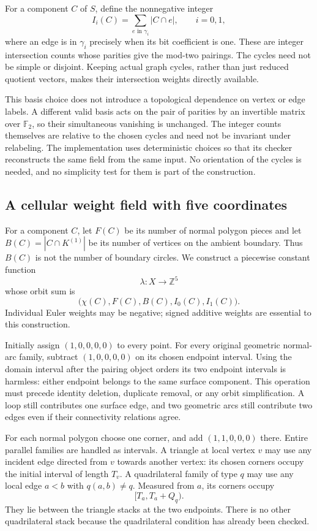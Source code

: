 For a component $C$ of $S$, define the nonnegative integer
\[
 I_i(C)=\sum_{e\text{ in }\gamma_i}|C\cap e|,
 \qquad i=0,1,
\]
where an edge is in $\gamma_i$ precisely when its bit coefficient
is one.  These are integer intersection counts whose parities give
the mod-two pairings.  The cycles need not be simple or disjoint.
Keeping actual graph cycles, rather than just reduced quotient
vectors, makes their intersection weights directly available.

This basis choice does not introduce a topological dependence on
vertex or edge labels.  A different valid basis acts on the pair
of parities by an invertible matrix over $\mathbb F_2$, so their
simultaneous vanishing is unchanged.  The integer counts themselves
are relative to the chosen cycles and need not be invariant under
relabeling.  The implementation uses deterministic choices so that
its checker reconstructs the same field from the same input.  No
orientation of the cycles is needed, and no simplicity test for
them is part of the construction.

\subsection{A cellular weight field with five coordinates}
\label{nc:weights}

For a component $C$, let $F(C)$ be its number of normal polygon
pieces and let $B(C)=|C\cap K^{(1)}|$ be its number of vertices on
the ambient boundary.  Thus $B(C)$ is not the number of boundary
circles.  We construct a piecewise constant function
\[
 \lambda:X\longrightarrow\mathbb Z^5
\]
whose orbit sum is
\begin{equation}\label{nc:profile-vector}
 \bigl(\chi(C),F(C),B(C),I_0(C),I_1(C)\bigr).
\end{equation}
Individual Euler weights may be negative; signed additive weights
are essential to this construction.

Initially assign $(1,0,0,0,0)$ to every point.  For every original
geometric normal-arc family, subtract $(1,0,0,0,0)$ on its chosen
endpoint interval.  Using the domain interval after the pairing
object orders its two endpoint intervals is harmless: either
endpoint belongs to the same surface component.  This operation
must precede identity deletion, duplicate removal, or any orbit
simplification.  A loop still contributes one surface edge, and
two geometric arcs still contribute two edges even if their
connectivity relations agree.

For each normal polygon choose one corner, and add
$(1,1,0,0,0)$ there.  Entire parallel families are handled as
intervals.  A triangle at local vertex $v$ may use any incident edge
directed from $v$ towards another vertex: its chosen corners occupy
the initial interval of length $T_v$.  A quadrilateral family of
type $q$ may use any local edge $a<b$ with $q(a,b)\ne q$.
Measured from $a$, its corners occupy
\[
 [T_a,T_a+Q_q).
\]
They lie between the triangle stacks at the two endpoints.  There
is no other quadrilateral stack because the quadrilateral condition
has already been checked.


